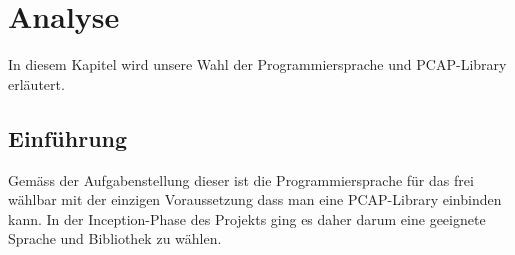 \chapter{Analyse}
\label{chap:Analyse}

In diesem Kapitel wird unsere Wahl der Programmiersprache und \acs{PCAP}-Library erläutert.

\section{Einführung}
Gemäss der Aufgabenstellung dieser \work ist die Programmiersprache für das \tool frei wählbar mit der einzigen Voraussetzung dass man eine \acs{PCAP}-Library einbinden kann. In der Inception-Phase des Projekts ging es daher darum eine geeignete Sprache und Bibliothek zu wählen.



